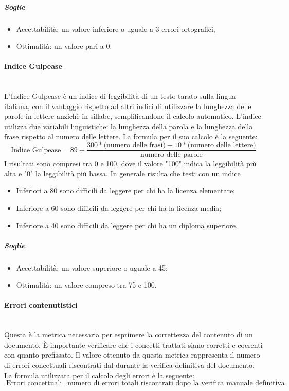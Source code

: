 \subparagraph{Soglie}
\begin{itemize}
\item Accettabilità: un valore inferiore o uguale a 3 errori ortografici;
\item Ottimalità: un valore pari a 0.
\end{itemize}

\paragraph{Indice Gulpease}
\label{AppB:IndiceGulpease}
	~\\L'{Indice Gulpease} è un indice di leggibilità di un testo tarato sulla lingua italiana, con il vantaggio rispetto ad altri indici di utilizzare la lunghezza delle parole in lettere anzichè in sillabe, semplificandone il calcolo automatico. L'indice utilizza due variabili linguistiche: la lunghezza della parola e la lunghezza della frase rispetto al numero delle lettere.
\newline La formula per il suo calcolo è la seguente:
\begin{displaymath}
\mbox{{Indice Gulpease}}= 89+\frac{300*\mbox{(numero delle frasi)}-10*\mbox{(numero delle lettere)}}{\mbox{numero delle parole}}
\end{displaymath}
I risultati sono compresi tra 0 e 100, dove il valore "100" indica la leggibilità più alta e "0" la leggibilità più bassa. In generale risulta che testi con un indice
\begin{itemize}
	\item Inferiori a 80 sono difficili da leggere per chi ha la licenza elementare;
	\item Inferiore a 60 sono difficili da leggere per chi ha la licenza media;
	\item Inferiore a 40 sono difficili da leggere per chi ha un diploma superiore.
\end{itemize}

\subparagraph{Soglie}
\begin{itemize}
\item Accettabilità: un valore superiore o uguale a 45;
\item Ottimalità: un valore compreso tra 75 e 100.
\end{itemize}

\paragraph{Errori contenutistici}
\label{AppB:ErroriCont}
	~\\Questa è la metrica necessaria per esprimere la correttezza del contenuto di un documento. È importante verificare che i concetti trattati siano corretti e coerenti con quanto prefissato. Il valore ottenuto da questa metrica rappresenta il numero di errori concettuali riscontrati dal \ver{} durante la verifica definitiva del documento.
\newline La formula utilizzata per il calcolo degli errori è la seguente:
\begin{displaymath}
\mbox{Errori concettuali}={\mbox{numero di errori totali riscontrati dopo la verifica manuale definitiva}}
\end{displaymath}

